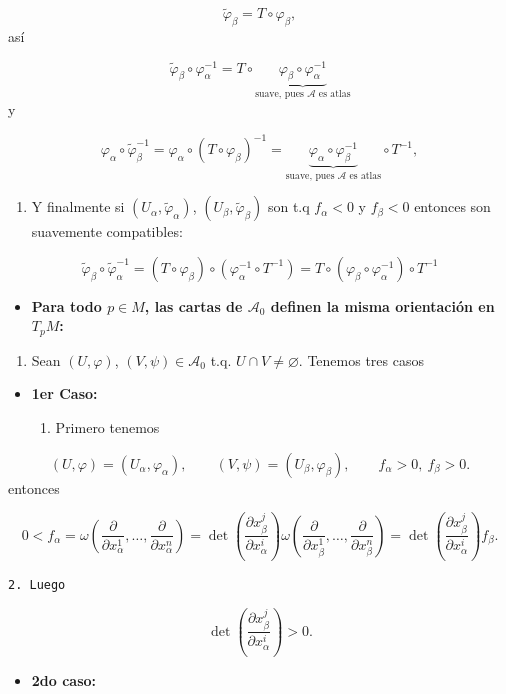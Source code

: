\begin{bookproof}{}
\[
\widetilde\varphi_\beta=T\circ\varphi_\beta,
\]
así

\[
\widetilde\varphi_\beta\circ\varphi_\alpha^{-1}=T\circ \underbrace{\varphi_\beta\circ\varphi_\alpha^{-1}}_{\text{suave, pues }\mathcal A\text{ es atlas}}
\]
y

\[
\varphi_\alpha\circ\widetilde\varphi_\beta^{-1}=\varphi_\alpha\circ(T\circ\varphi_\beta)^{-1}=\underbrace{\varphi_\alpha\circ\varphi_\beta^{-1}}_{\text{suave, pues }\mathcal A\text{ es atlas}}\circ T^{-1},
\]
\begin{enumerate}[start=3]
\item Y finalmente si $(U_\alpha,\widetilde\varphi_\alpha)$, $(U_\beta,\widetilde\varphi_\beta)$ son t.q $f_{\alpha }<0$ y $f_{\beta}<0$ entonces son suavemente compatibles:
\end{enumerate}
\[
\widetilde\varphi_\beta\circ\widetilde\varphi_\alpha^{-1}=(T\circ\varphi_\beta)\circ(\varphi_\alpha^{-1}\circ T^{-1})=T\circ(\varphi_\beta\circ\varphi_\alpha^{-1})\circ T^{-1}
\]
\begin{itemize}
\item \textbf{Para todo $p\in M$, las cartas de $\mathcal A_0$ definen la misma orientación en $T_pM$:}
\end{itemize}
\begin{enumerate}
\item Sean $(U,\varphi)$, $(V,\psi)\in\mathcal A_0$ t.q. $U\cap V\neq\varnothing$. Tenemos tres casos
\end{enumerate}
\begin{itemize}
\item \textbf{1er Caso:}

\begin{enumerate}
\item Primero tenemos
\end{enumerate}
\end{itemize}
\[
(U,\varphi)=(U_\alpha,\varphi_\alpha),\qquad (V,\psi)=(U_\beta,\varphi_\beta),\qquad f_\alpha>0,\ f_\beta>0.
\]
entonces

\[
0<f_\alpha=\omega\!\left(\frac{\partial}{\partial x_\alpha^1},\ldots,\frac{\partial}{\partial x_\alpha^n}\right)=\det\!\left(\frac{\partial x_\beta^j}{\partial x_\alpha^i}\right)\omega\!\left(\frac{\partial}{\partial x_\beta^1},\ldots,\frac{\partial}{\partial x_\beta^n}\right)=\det\!\left(\frac{\partial x_\beta^j}{\partial x_\alpha^i}\right)f_\beta.
\]
\begin{Verbatim}[fontsize=\small]
 2. Luego 
\end{Verbatim}
\[
\det\!\left(\frac{\partial x_\beta^j}{\partial x_\alpha^i}\right)>0.
\]
\begin{itemize}
\item \textbf{2do caso:}


\end{itemize}
\end{bookproof}
